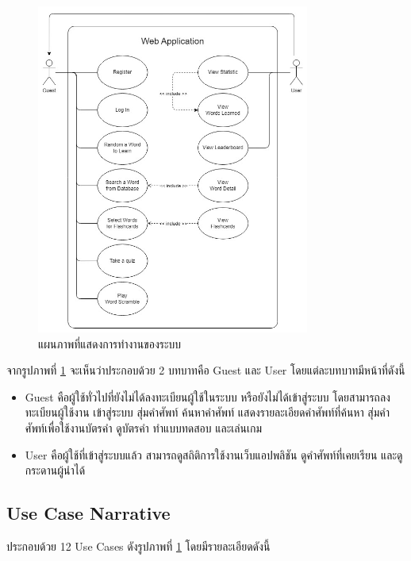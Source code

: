 \documentclass[12pt,oneside,openright,a4paper]{cpe-thai-project}
\begin{document}
\begin{figure}[!h]\centering
	\includegraphics[width=0.8\textwidth, keepaspectratio=true]{image/chap3/UseCaseDiagram.jpg}
	\caption{แผนภาพที่แสดงการทำงานของระบบ}\label{fig:UseCaseDiagram}
\end{figure}

\hspace{1cm}
จากรูปภาพที่ \ref{fig:UseCaseDiagram} จะเห็นว่าประกอบด้วย 2 บทบาทคือ Guest และ User โดยแต่ละบทบาทมีหน้าที่ดังนี้
\begin{itemize}
	\item Guest คือผู้ใช้ทั่วไปที่ยังไม่ได้ลงทะเบียนผู้ใช้ในระบบ หรือยังไม่ได้เข้าสู่ระบบ
	      โดยสามารถลงทะเบียนผู้ใช้งาน เข้าสู่ระบบ สุ่มคำศัพท์ ค้นหาคำศัพท์ แสดงรายละเอียดคำศัพท์ที่ค้นหา
	      สุ่มคำศัพท์เพื่อใช้งานบัตรคำ ดูบัตรคำ ทำแบบทดสอบ และเล่นเกม
	\item User คือผู้ใช้ที่เข้าสู่ระบบแล้ว สามารถดูสถิติการใช้งานเว็บแอปพลิชัน ดูคำศัพท์ที่เคยเรียน และดูกระดานผู้นำได้
\end{itemize}

\subsection{Use Case Narrative}
ประกอบด้วย 12 Use Cases ดังรูปภาพที่ \ref{fig:UseCaseDiagram} โดยมีรายละเอียดดังนี้
\end{document}
